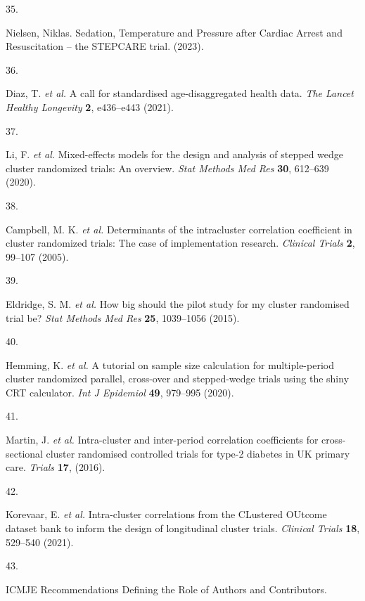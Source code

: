 \documentclass[
]{scrartcl}
\newlength{\cslhangindent}
\newlength{\csllabelwidth}
\newlength{\cslentryspacingunit} %
\newenvironment{CSLReferences}[2] %
 {%
  \setlength{\parindent}{0pt}
  \ifodd #1
  \let\oldpar\par
  \def\par{\hangindent=\cslhangindent\oldpar}
  \fi
  \setlength{\parskip}{#2\cslentryspacingunit}
 }%
 {}
\newcommand{\CSLLeftMargin}[1]{\parbox[t]{\csllabelwidth}{#1}}
\newcommand{\CSLRightInline}[1]{\parbox[t]{\linewidth - \csllabelwidth}{#1}\break}
\begin{document}
\begin{CSLReferences}{0}{0}
\leavevmode{}%
\CSLLeftMargin{35. }%
\CSLRightInline{Nielsen, Niklas. Sedation, {Temperature} and {Pressure}
after {Cardiac} {Arrest} and {Resuscitation} -- the {STEPCARE} trial.
(2023).}

\leavevmode{}%
\CSLLeftMargin{36. }%
\CSLRightInline{Diaz, T. \emph{et al.} A call for standardised
age-disaggregated health data. \emph{The Lancet Healthy Longevity}
\textbf{2}, e436--e443 (2021).}

\leavevmode{}%
\CSLLeftMargin{37. }%
\CSLRightInline{Li, F. \emph{et al.} Mixed-effects models for the design
and analysis of stepped wedge cluster randomized trials: An overview.
\emph{Stat Methods Med Res} \textbf{30}, 612--639 (2020).}

\leavevmode{}%
\CSLLeftMargin{38. }%
\CSLRightInline{Campbell, M. K. \emph{et al.} Determinants of the
intracluster correlation coefficient in cluster randomized trials: The
case of implementation research. \emph{Clinical Trials} \textbf{2},
99--107 (2005).}

\leavevmode{}%
\CSLLeftMargin{39. }%
\CSLRightInline{Eldridge, S. M. \emph{et al.} How big should the pilot
study for my cluster randomised trial be? \emph{Stat Methods Med Res}
\textbf{25}, 1039--1056 (2015).}

\leavevmode{}%
\CSLLeftMargin{40. }%
\CSLRightInline{Hemming, K. \emph{et al.} A tutorial on sample size
calculation for multiple-period cluster randomized parallel, cross-over
and stepped-wedge trials using the shiny CRT calculator. \emph{Int J
Epidemiol} \textbf{49}, 979--995 (2020).}

\leavevmode{}%
\CSLLeftMargin{41. }%
\CSLRightInline{Martin, J. \emph{et al.} Intra-cluster and inter-period
correlation coefficients for cross-sectional cluster randomised
controlled trials for type-2 diabetes in UK primary care. \emph{Trials}
\textbf{17}, (2016).}

\leavevmode{}%
\CSLLeftMargin{42. }%
\CSLRightInline{Korevaar, E. \emph{et al.} Intra-cluster correlations
from the CLustered OUtcome dataset bank to inform the design of
longitudinal cluster trials. \emph{Clinical Trials} \textbf{18},
529--540 (2021).}

\leavevmode{}%
\CSLLeftMargin{43. }%
\CSLRightInline{{ICMJE} {\textbar} {Recommendations} {\textbar}
{Defining} the {Role} of {Authors} and {Contributors}.}

\end{CSLReferences}
\end{document}
